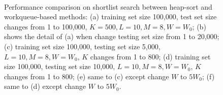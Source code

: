 \begin{figure}[t]
    \\
\caption[Performance comparison between heap-sort and workqueue-based methods used in Bi-level LSH shortlist search]{\label{fig:6:res:workqueuecomp} Performance comparison on shortlist search between heap-sort and workqueue-based methods: (a) training set size 100,000, test set size changes from 1 to 100,000, $K=500, L=10, M=8, W=W_0$; (b) shows the detail of (a) when change testing set size from 1 to 20,000; (c) training set size 100,000, testing set size 5,000, $L=10, M=8, W=W_0$, $K$ changes from 1 to 800; (d) training set size 100,000, testing set size 10,000, $L=10, M=8, W=W_0$, $K$ changes from 1 to 800; (e) same to (c) except change $W$ to $5W_0$; (f) same to (d) except change $W$ to $5W_0$.}

\end{figure}
